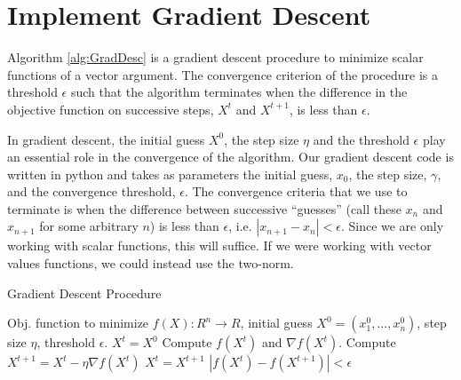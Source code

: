 \documentclass{article}
\begin{document}
 


\section{Implement Gradient Descent}

Algorithm \ref{alg:GradDesc} is a gradient descent procedure to minimize scalar functions of a vector argument. The convergence criterion of the procedure is a threshold $\epsilon$ such that the algorithm terminates when the difference in the objective function on successive steps, $X^t$ and $X^{t+1}$, is less than $\epsilon$.

In gradient descent, the initial guess $X^0$, the step size $\eta$ and the threshold $\epsilon$ play an essential role in the convergence of the algorithm.
Our gradient descent code is written in python and takes as parameters the initial guess, $x_0$, the step size, $\gamma$, and the convergence threshold, $\epsilon$.  The convergence criteria that we use to terminate is when the difference between successive ``guesses'' (call these $x_n$ and $x_{n+1}$ for some arbitrary $n$) is less than $\epsilon$, i.e. $|x_{n+1} -x_n | < \epsilon$.  Since we are only working with scalar functions, this will suffice.  If we were working with vector values functions, we could instead use the two-norm.  

\begin{algorithm}[tb]
   \caption{Gradient Descent Procedure}
   \label{alg:GradDesc}
\begin{algorithmic}
   \STATE Obj. function to minimize $f(X):R^n \rightarrow R$, 
   \STATE initial guess  $X^0=(x^0_1,...,x^0_n)$, 
   \STATE step size $\eta$, 
   \STATE threshold $\epsilon$.
    $X^t=X^0$
   \REPEAT
   \STATE Compute  $f(X^t)$ and $\nabla f(X^t)$.
   \STATE Compute $X^{t+1}=X^t-\eta \nabla f(X^t)$
   \STATE $X^t=X^{t+1}$
   \UNTIL $\left| f(X^{t})-f(X^{t+1})\right|<\epsilon$
\end{algorithmic}
\end{algorithm}
\end{document}
